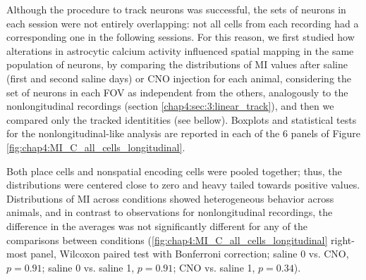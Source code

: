 Although the procedure to track neurons was successful, the sets of neurons in each session were not entirely overlapping: not all cells from each recording had a corresponding one in the following sessions.
For this reason, we first studied how alterations in astrocytic calcium activity influenced spatial mapping in the same population of neurons, by comparing the distributions of MI values after saline (first and second saline days) or CNO injection for each animal, considering the set of neurons in each FOV as independent from the others, analogously to the nonlongitudinal recordings (section \ref{chap4:sec:3:linear_track}), and then we compared only the tracked identitities (see bellow).
Boxplots and statistical tests for the nonlongitudinal-like analysis are reported in each of the 6 panels of Figure \ref{fig:chap4:MI_C_all_cells_longitudinal}.

Both place cells and nonspatial encoding cells were pooled together; thus, the distributions were centered close to zero and heavy tailed towards positive values.
Distributions of MI across conditions showed heterogeneous behavior across animals, and in contrast to observations for nonlongitudinal recordings, the difference in the averages was not significantly different for any of the comparisons between conditions (\ref{fig:chap4:MI_C_all_cells_longitudinal} right-most panel, Wilcoxon paired test with Bonferroni correction; saline 0 vs. CNO, $p=0.91$; saline 0 vs. saline 1, $p=0.91$; CNO vs. saline 1, $p=0.34$).

